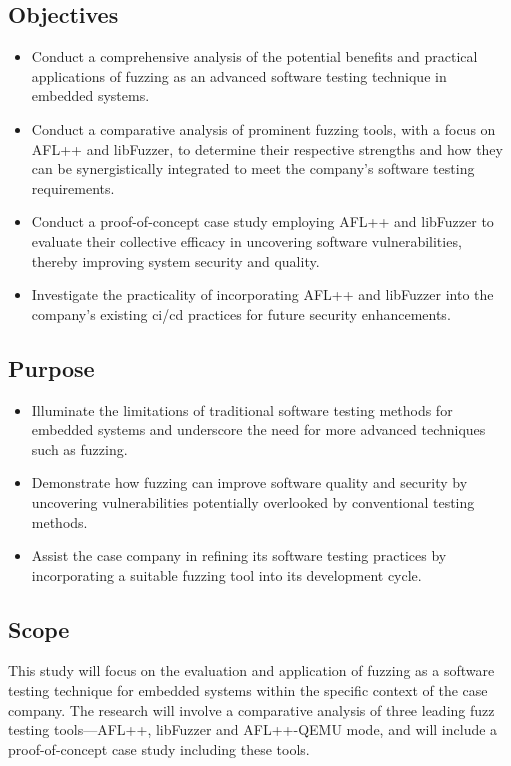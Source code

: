 \subsection{Objectives}
\begin{itemize}
    \item Conduct a comprehensive analysis of the potential benefits and practical
          applications of fuzzing as an advanced software testing technique in embedded systems.
    \item Conduct a comparative analysis of prominent fuzzing tools, with a
          focus on AFL++ and libFuzzer, to determine their respective strengths and
          how they can be synergistically integrated to meet the company's software
          testing requirements.
    \item Conduct a proof-of-concept case study employing AFL++ and libFuzzer to
          evaluate their collective efficacy in uncovering software vulnerabilities,
          thereby improving system security and quality.
    \item Investigate the practicality of incorporating AFL++ and libFuzzer
          into the company's existing \acrlong{ci/cd} practices for future security enhancements.
\end{itemize}

\subsection{Purpose}
\begin{itemize}
    \item Illuminate the limitations of traditional software testing methods for
          embedded systems and underscore the need for more advanced techniques such as fuzzing.
    \item Demonstrate how fuzzing can improve software quality and security by
          uncovering vulnerabilities potentially overlooked by conventional testing methods.
    \item Assist the case company in refining its software testing practices by
          incorporating a suitable fuzzing tool into its development cycle.
\end{itemize}

\subsection{Scope}
This study will focus on the evaluation and application of fuzzing as a software
testing technique for embedded systems within the specific context of the
case company. The research will involve a comparative analysis of three leading
fuzz testing tools—AFL++, libFuzzer and AFL++-QEMU mode, and will include a proof-of-concept
case study including these tools.

